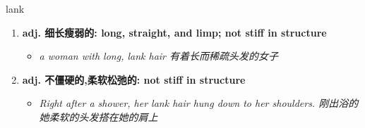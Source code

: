 
\begin{frame}
{\huge lank}
\begin{center}
\begin{enumerate}\Large
  \item \textbf{adj. 细长瘦弱的: long, straight, and limp; not stiff in structure}
  \begin{itemize}
    \item \em{\Large{a woman with long, lank hair 有着长而稀疏头发的女子}}
  \end{itemize}
  \item \textbf{adj. 不僵硬的,柔软松弛的: not stiff in structure}
  \begin{itemize}
    \item \em{\Large{Right after a shower, her lank hair hung down to her shoulders. 刚出浴的她柔软的头发搭在她的肩上}}
  \end{itemize}
\end{enumerate}
\end{center}
\end{frame}
